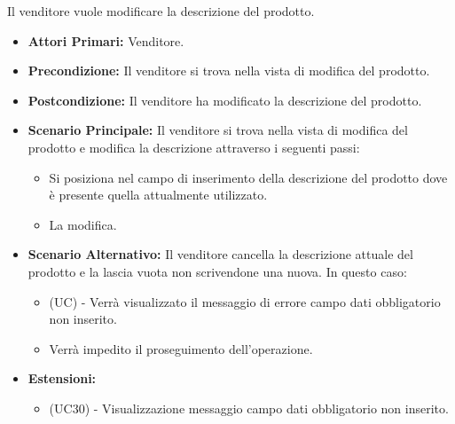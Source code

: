 Il venditore vuole modificare la descrizione del prodotto.
\begin{itemize}
    \item \textbf{Attori Primari:} Venditore.
    \item \textbf{Precondizione:} Il venditore si trova nella vista di modifica del prodotto.
    \item \textbf{Postcondizione:} Il venditore ha modificato la descrizione del prodotto.
    \item \textbf{Scenario Principale:} Il venditore si trova nella vista di modifica del prodotto e modifica la descrizione attraverso i seguenti passi:
    \begin{itemize}
        \item Si posiziona nel campo di inserimento della descrizione del prodotto dove è presente quella attualmente utilizzato.
        \item La modifica.
    \end{itemize}
    \item \textbf{Scenario Alternativo:} Il venditore cancella la descrizione attuale del prodotto e la lascia vuota non scrivendone una nuova. In questo caso:
    \begin{itemize}
        \item (UC) - Verrà visualizzato il messaggio di errore campo dati obbligatorio non inserito.
        \item Verrà impedito il proseguimento dell'operazione.
    \end{itemize}
    \item \textbf{Estensioni:}
    \begin{itemize}
        \item (UC30) - Visualizzazione messaggio campo dati obbligatorio non inserito.
    \end{itemize}
\end{itemize}

